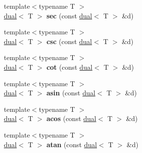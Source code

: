 \begin{DoxyCompactItemize}
\item 
\hypertarget{namespace_d_r_d_s_p_a383bb801e23a931321c789ff4157d723}{{\footnotesize template$<$typename T $>$ }\\\hyperlink{struct_d_r_d_s_p_1_1dual}{dual}$<$ T $>$ {\bfseries sec} (const \hyperlink{struct_d_r_d_s_p_1_1dual}{dual}$<$ T $>$ \&d)}\label{namespace_d_r_d_s_p_a383bb801e23a931321c789ff4157d723}

\item 
\hypertarget{namespace_d_r_d_s_p_a8eaaf73ab84dcb6f2610c68712c70a29}{{\footnotesize template$<$typename T $>$ }\\\hyperlink{struct_d_r_d_s_p_1_1dual}{dual}$<$ T $>$ {\bfseries csc} (const \hyperlink{struct_d_r_d_s_p_1_1dual}{dual}$<$ T $>$ \&d)}\label{namespace_d_r_d_s_p_a8eaaf73ab84dcb6f2610c68712c70a29}

\item 
\hypertarget{namespace_d_r_d_s_p_a14cafc80edc330cd57d33e3e2854ed35}{{\footnotesize template$<$typename T $>$ }\\\hyperlink{struct_d_r_d_s_p_1_1dual}{dual}$<$ T $>$ {\bfseries cot} (const \hyperlink{struct_d_r_d_s_p_1_1dual}{dual}$<$ T $>$ \&d)}\label{namespace_d_r_d_s_p_a14cafc80edc330cd57d33e3e2854ed35}

\item 
\hypertarget{namespace_d_r_d_s_p_ac360d99ce5838c1ab94c865dadc1637f}{{\footnotesize template$<$typename T $>$ }\\\hyperlink{struct_d_r_d_s_p_1_1dual}{dual}$<$ T $>$ {\bfseries asin} (const \hyperlink{struct_d_r_d_s_p_1_1dual}{dual}$<$ T $>$ \&d)}\label{namespace_d_r_d_s_p_ac360d99ce5838c1ab94c865dadc1637f}

\item 
\hypertarget{namespace_d_r_d_s_p_a1e41ca6ff603f760d2fa57710bf288b0}{{\footnotesize template$<$typename T $>$ }\\\hyperlink{struct_d_r_d_s_p_1_1dual}{dual}$<$ T $>$ {\bfseries acos} (const \hyperlink{struct_d_r_d_s_p_1_1dual}{dual}$<$ T $>$ \&d)}\label{namespace_d_r_d_s_p_a1e41ca6ff603f760d2fa57710bf288b0}

\item 
\hypertarget{namespace_d_r_d_s_p_ae8517951e5431980f4a31dd17f08e068}{{\footnotesize template$<$typename T $>$ }\\\hyperlink{struct_d_r_d_s_p_1_1dual}{dual}$<$ T $>$ {\bfseries atan} (const \hyperlink{struct_d_r_d_s_p_1_1dual}{dual}$<$ T $>$ \&d)}\label{namespace_d_r_d_s_p_ae8517951e5431980f4a31dd17f08e068}


\end{DoxyCompactItemize}

